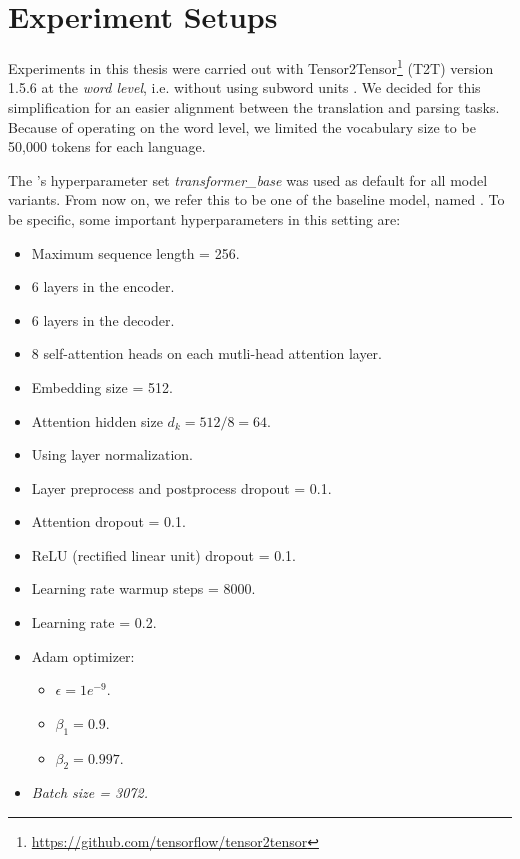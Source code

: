 \section{Experiment Setups}
\label{dataexp-exp}

Experiments in this thesis were carried out with Tensor2Tensor\footnote{\url{https://github.com/tensorflow/tensor2tensor}} (T2T) version 1.5.6 at the
\emph{word level}, i.e. without using subword units \citep{sennrich2015neural}.
We decided for this simplification for an easier alignment between the translation and parsing tasks.
Because of operating on the word level, we limited the vocabulary size to be 50,000 tokens for each language.

The \transformer's hyperparameter set \textit{transformer\_base} \citep{TrainingTipsfortheTransformerModel} was used as default for all model variants.
From now on, we refer this to be one of the baseline model, named \transformerbase. To be specific, some important hyperparameters in this setting are:

\begin{itemize}
    \item Maximum sequence length = 256.
    \item 6 layers in the encoder.
    \item 6 layers in the decoder.
    \item 8 self-attention heads on each mutli-head attention layer.
    \item Embedding size = 512.
    \item Attention hidden size $d_k=512/8=64$.
    \item Using layer normalization.
    \item Layer preprocess and postprocess dropout = 0.1.
    \item Attention dropout = 0.1.
    \item ReLU (rectified linear unit) dropout = 0.1.
    \item Learning rate warmup steps = 8000.
    \item Learning rate = 0.2.
    \item Adam optimizer:
        \begin{itemize}
            \item $\epsilon = 1e^{-9}$.
            \item $\beta_1 = 0.9$.
            \item $\beta_2 = 0.997$.
        \end{itemize}
    \item \textit{Batch size = 3072.}
\end{itemize}

